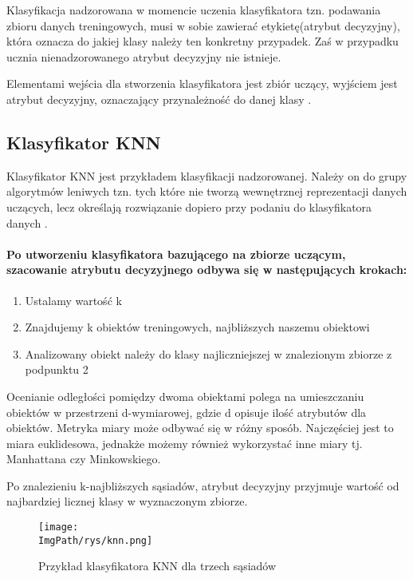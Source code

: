 \documentclass[a4paper,12pt,twoside,openany]{report}
\newcommand{\ImgPath}{.}
\begin{document}
Klasyfikacja nadzorowana w momencie uczenia klasyfikatora tzn. podawania zbioru danych treningowych, musi w sobie zawierać etykietę(atrybut decyzyjny), która oznacza do jakiej klasy należy ten konkretny przypadek. Zaś w przypadku ucznia nienadzorowanego atrybut decyzyjny nie istnieje.

Elementami wejścia dla stworzenia klasyfikatora jest zbiór uczący, wyjściem jest atrybut decyzyjny, oznaczający przynależność do danej klasy \cite{Malina2}.

\subsection{Klasyfikator KNN}
Klasyfikator KNN jest przykładem klasyfikacji nadzorowanej. Należy on do grupy algorytmów leniwych tzn. tych które nie tworzą wewnętrznej reprezentacji danych uczących, lecz określają rozwiązanie dopiero przy podaniu do klasyfikatora danych \cite{knn2}.

\paragraph{Po utworzeniu klasyfikatora bazującego na zbiorze uczącym, szacowanie atrybutu decyzyjnego odbywa się w następujących krokach: }
\begin{enumerate}
	\item Ustalamy wartość k
	\item Znajdujemy k obiektów treningowych, najbliższych naszemu obiektowi
	\item Analizowany obiekt należy do klasy najliczniejszej w znalezionym zbiorze z podpunktu 2
\end{enumerate}

Ocenianie odległości pomiędzy dwoma obiektami polega na umieszczaniu obiektów w przestrzeni d-wymiarowej, gdzie d opisuje ilość atrybutów dla obiektów. Metryka miary może odbywać się w różny sposób. Najczęściej jest to miara euklidesowa, jednakże możemy również wykorzystać inne miary tj. Manhattana czy Minkowskiego. 

Po znalezieniu k-najbliższych sąsiadów, atrybut decyzyjny przyjmuje wartość od najbardziej licznej klasy w wyznaczonym zbiorze.

\begin{figure}[H]	
	\centering
	\texttt{[image: \\ImgPath/rys/knn.png]}
	
	\caption{Przykład klasyfikatora KNN dla trzech sąsiadów}
\end{figure}
\end{document}
